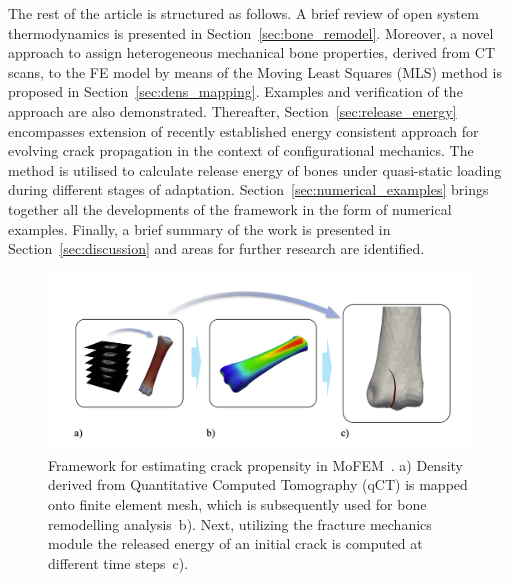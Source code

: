 \documentclass[11pt]{acmeArticle}
\numberwithin{equation}{section}
\begin{document}
The rest of the article is structured as follows.
A brief review of open system thermodynamics is presented in Section~\ref{sec:bone_remodel}.
Moreover, a novel approach to assign heterogeneous mechanical bone properties, derived from CT scans,
to the FE model by means of the Moving Least Squares (MLS) method is proposed in Section~\ref{sec:dens_mapping}.
Examples and verification of the approach are also demonstrated. 
Thereafter, Section~\ref{sec:release_energy} encompasses extension of recently established energy consistent approach 
for evolving crack propagation in the context of configurational mechanics. The method is utilised to calculate release energy of bones under quasi-static loading during different stages of adaptation. 
Section~\ref{sec:numerical_examples} brings together all the developments of the framework in the form of numerical examples. 
Finally, a brief summary of the work is presented in Section~\ref{sec:discussion} and areas for further research are identified.
\begin{figure}[h!]
\begin{center}
\includegraphics[width=16cm]{Figures/framework.png}
\caption{Framework for estimating crack propensity in MoFEM~\citep{mofem2017}. a) Density derived from Quantitative Computed Tomography (qCT) is mapped onto finite element mesh, which is subsequently used for bone remodelling analysis~b). 
Next, utilizing the fracture mechanics module the released energy of an initial crack is computed at different time steps~c).}
\label{fig:framework}
\end{center}
\end{figure}
\end{document}
